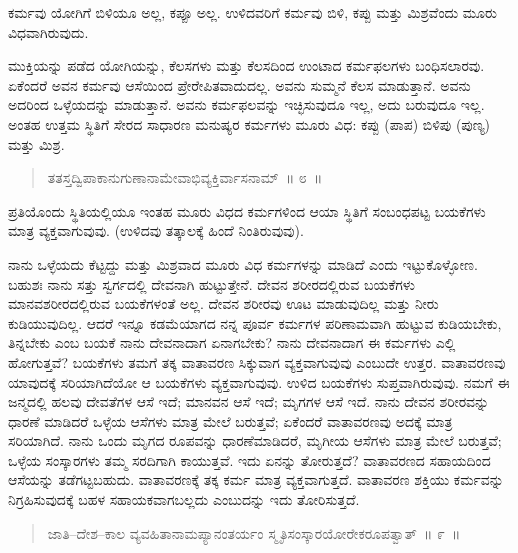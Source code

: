 \vspace{-0.3cm}

ಕರ್ಮವು ಯೋಗಿಗೆ ಬಿಳಿಯೂ ಅಲ್ಲ, ಕಪ್ಪೂ ಅಲ್ಲ. ಉಳಿದವರಿಗೆ ಕರ್ಮವು ಬಿಳಿ, ಕಪ್ಪು ಮತ್ತು ಮಿಶ್ರವೆಂದು ಮೂರು ವಿಧವಾಗಿರುವುದು. 

ಮುಕ್ತಿಯನ್ನು ಪಡೆದ ಯೋಗಿಯನ್ನು, ಕೆಲಸಗಳು ಮತ್ತು ಕೆಲಸದಿಂದ ಉಂಟಾದ ಕರ್ಮಫಲಗಳು ಬಂಧಿಸಲಾರವು. ಏಕೆಂದರೆ ಅವನ ಕರ್ಮವು ಆಸೆಯಿಂದ ಪ್ರೇರೇಪಿತವಾದುದಲ್ಲ. ಅವನು ಸುಮ್ಮನೆ ಕೆಲಸ ಮಾಡುತ್ತಾನೆ. ಅವನು ಅದರಿಂದ ಒಳ್ಳೆಯದನ್ನು ಮಾಡುತ್ತಾನೆ. ಅವನು ಕರ್ಮಫಲವನ್ನು ಇಚ್ಛಿಸುವುದೂ ಇಲ್ಲ, ಅದು ಬರುವುದೂ ಇಲ್ಲ. ಅಂತಹ ಉತ್ತಮ ಸ್ಥಿತಿಗೆ ಸೇರದ ಸಾಧಾರಣ ಮನುಷ್ಯರ ಕರ್ಮಗಳು ಮೂರು ವಿಧ: ಕಪ್ಪು (ಪಾಪ) ಬಿಳಿಪು (ಪುಣ್ಯ) ಮತ್ತು ಮಿಶ್ರ. 

\vspace{-0.3cm}

\begin{verse}
ತತಸ್ತದ್ವಿಪಾಕಾನುಗುಣಾನಾಮೇವಾಭಿವ್ಯಕ್ತಿರ್ವಾಸನಾಮ್​~॥ ೮~॥
\end{verse}

\vspace{-0.3cm}

ಪ್ರತಿಯೊಂದು ಸ್ಥಿತಿಯಲ್ಲಿಯೂ ಇಂತಹ ಮೂರು ವಿಧದ ಕರ್ಮಗಳಿಂದ ಆಯಾ ಸ್ಥಿತಿಗೆ ಸಂಬಂಧಪಟ್ಟ ಬಯಕೆಗಳು ಮಾತ್ರ ವ್ಯಕ್ತವಾಗುವುವು. (ಉಳಿದವು ತತ್ಕಾಲಕ್ಕೆ ಹಿಂದೆ ನಿಂತಿರುವುವು). 

ನಾನು ಒಳ್ಳೆಯದು ಕೆಟ್ಟದ್ದು ಮತ್ತು ಮಿಶ್ರವಾದ ಮೂರು ವಿಧ ಕರ್ಮಗಳನ್ನು ಮಾಡಿದೆ ಎಂದು ಇಟ್ಟುಕೊಳ್ಳೋಣ. ಬಹುಶಃ ನಾನು ಸತ್ತು ಸ್ವರ್ಗದಲ್ಲಿ ದೇವನಾಗಿ ಹುಟ್ಟುತ್ತೇನೆ. ದೇವನ ಶರೀರದಲ್ಲಿರುವ ಬಯಕೆಗಳು ಮಾನವಶರೀರದಲ್ಲಿರುವ ಬಯಕೆಗಳಂತೆ ಅಲ್ಲ. ದೇವನ ಶರೀರವು ಊಟ ಮಾಡುವುದಿಲ್ಲ ಮತ್ತು ನೀರು ಕುಡಿಯುವುದಿಲ್ಲ. ಆದರೆ ಇನ್ನೂ ಕಡಮೆಯಾಗದ ನನ್ನ ಪೂರ್ವ ಕರ್ಮಗಳ ಪರಿಣಾಮವಾಗಿ ಹುಟ್ಟುವ ಕುಡಿಯಬೇಕು, ತಿನ್ನಬೇಕು ಎಂಬ ಬಯಕೆ ನಾನು ದೇವನಾದಾಗ ಏನಾಗಬೇಕು? ನಾನು ದೇವನಾದಾಗ ಈ ಕರ್ಮಗಳು ಎಲ್ಲಿ ಹೋಗುತ್ತವೆ? ಬಯಕೆಗಳು ತಮಗೆ ತಕ್ಕ ವಾತಾವರಣ ಸಿಕ್ಕುವಾಗ ವ್ಯಕ್ತವಾಗುವುವು ಎಂಬುದೇ ಉತ್ತರ. ವಾತಾವರಣವು ಯಾವುದಕ್ಕೆ ಸರಿಯಾಗಿದೆಯೋ ಆ ಬಯಕೆಗಳು ವ್ಯಕ್ತವಾಗುವುವು. ಉಳಿದ ಬಯಕೆಗಳು ಸುಪ್ತವಾಗಿರುವುವು. ನಮಗೆ ಈ ಜನ್ಮದಲ್ಲಿ ಹಲವು ದೇವತೆಗಳ ಆಸೆ ಇದೆ; ಮಾನವನ ಆಸೆ ಇದೆ; ಮೃಗಗಳ ಆಸೆ ಇದೆ. ನಾನು ದೇವನ ಶರೀರವನ್ನು ಧಾರಣೆ ಮಾಡಿದರೆ ಒಳ್ಳೆಯ ಆಸೆಗಳು ಮಾತ್ರ ಮೇಲೆ ಬರುತ್ತವೆ; ಏಕೆಂದರೆ ವಾತಾವರಣವು ಅದಕ್ಕೆ ಮಾತ್ರ ಸರಿಯಾಗಿದೆ. ನಾನು ಒಂದು ಮೃಗದ ರೂಪವನ್ನು ಧಾರಣೆಮಾಡಿದರೆ, ಮೃಗೀಯ ಆಸೆಗಳು ಮಾತ್ರ ಮೇಲೆ ಬರುತ್ತವೆ; ಒಳ್ಳೆಯ ಸಂಸ್ಕಾರಗಳು ತಮ್ಮ ಸರದಿಗಾಗಿ ಕಾಯುತ್ತವೆ. ಇದು ಏನನ್ನು ತೋರುತ್ತದೆ? ವಾತಾವರಣದ ಸಹಾಯದಿಂದ ಆಸೆಯನ್ನು ತಡೆಗಟ್ಟಬಹುದು. ವಾತಾವರಣಕ್ಕೆ ತಕ್ಕ ಕರ್ಮ ಮಾತ್ರ ವ್ಯಕ್ತವಾಗುತ್ತದೆ. ವಾತಾವರಣ ಶಕ್ತಿಯು ಕರ್ಮವನ್ನು ನಿಗ್ರಹಿಸುವುದಕ್ಕೆ ಬಹಳ ಸಹಾಯಕವಾಗಬಲ್ಲದು ಎಂಬುದನ್ನು ಇದು ತೋರಿಸುತ್ತದೆ. 

\vspace{-0.3cm}

\begin{verse}
ಜಾತಿ–ದೇಶ–ಕಾಲ ವ್ಯವಹಿತಾನಾಮಪ್ಯಾನಂತರ್ಯಂ ಸ್ಮೃತಿಸಂಸ್ಕಾರಯೋರೇಕರೂಪತ್ವಾತ್​~॥ ೯~॥
\end{verse}


